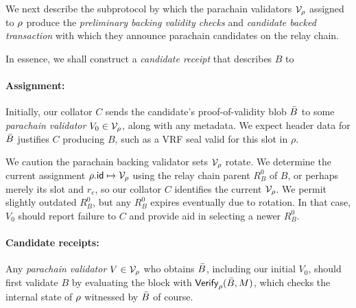 We next describe the subprotocol by which the parachain validators $\mathcal{V}_{\rho}$ assigned to $\rho$ produce the {\em preliminary backing validity checks} and {\em candidate backed transaction} with which they announce parachain candidates on the relay chain.

In essence, we shall construct a {\em candidate receipt} that describes $B$ to 

\smallskip\paragraph{Assignment:}

Initially, our collator $C$ sends the candidate's proof-of-validity blob $\bar{B}$ to some {\em parachain validator} $V_0 \in \mathcal{V}_{\rho}$, along with any metadata.  We expect header data for $\bar{B}$ justifies $C$ producing $B$, such as a VRF seal valid for this slot in $\rho$.

We caution the parachain backing validator sets $\mathcal{V}_{\rho}$ rotate.  We determine the current assignment $\rho.\mathsf{id} \mapsto \mathcal{V}_{\rho}$ using the relay chain parent $R^0_B$ of $B$, or perhaps merely its slot and $r_e$, so our collator $C$ identifies the current $\mathcal{V}_{\rho}$.  We permit slightly outdated $R^0_B$, but any $R^0_B$ expires eventually due to rotation.  In that case, $V_0$ should report failure to $C$ and provide aid in selecting a newer $R^0_B$. 

\smallskip\paragraph{Candidate receipts:}

Any {\em parachain validator} $V \in \mathcal{V}_{\rho}$ who obtains $\bar{B}$, including our initial $V_0$, should first validate $B$ by evaluating the block with $\mathsf{Verify}_{\rho}(\bar{B},M)$, which checks the internal state of $\rho$ witnessed by $\bar{B}$ of course.  

